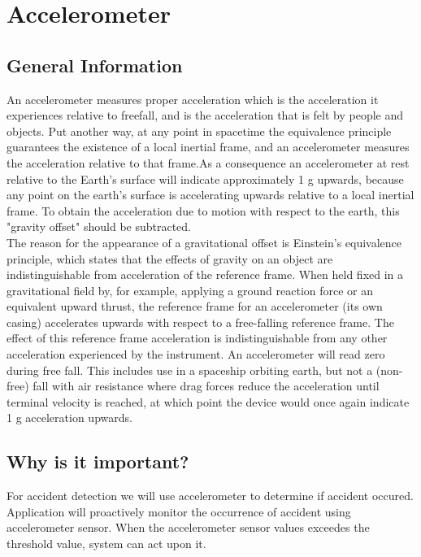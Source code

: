 \section{Accelerometer}
\subsection{General Information}
An accelerometer measures proper acceleration which is the acceleration it experiences relative to freefall, and is the acceleration that is felt by people and objects. Put another way, at any point in spacetime the equivalence principle guarantees the existence of a local inertial frame, and an accelerometer measures the acceleration relative to that frame.\cite{einstein_rel}As a consequence an accelerometer at rest relative to the Earth's surface will indicate approximately 1 g upwards, because any point on the earth's surface is accelerating upwards relative to a local inertial frame. To obtain the acceleration due to motion with respect to the earth, this "gravity offset" should be subtracted.\\
The reason for the appearance of a gravitational offset is Einstein's equivalence principle\cite{equivalence}, which states that the effects of gravity on an object are indistinguishable from acceleration of the reference frame. When held fixed in a gravitational field by, for example, applying a ground reaction force or an equivalent upward thrust, the reference frame for an accelerometer (its own casing) accelerates upwards with respect to a free-falling reference frame. The effect of this reference frame acceleration is indistinguishable from any other acceleration experienced by the instrument.
An accelerometer will read zero during free fall. This includes use in a spaceship orbiting earth, but not a (non-free) fall with air resistance where drag forces reduce the acceleration until terminal velocity is reached, at which point the device would once again indicate 1 g acceleration upwards.\\
\subsection{Why is it important?}
For accident detection we will use accelerometer to determine if accident occured\cite{accident}. Application will proactively monitor the occurrence of accident using accelerometer sensor. When the
accelerometer sensor values exceedes the threshold value, system can act upon it.




